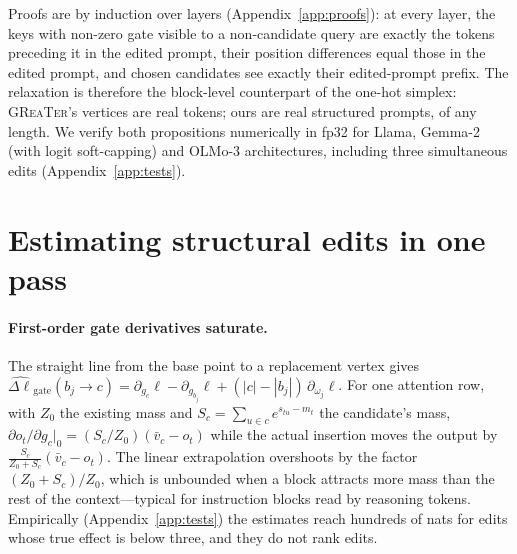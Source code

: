 \documentclass{article}
\newcommand{\greater}{\textsc{GReaTer}}
\begin{document}
Proofs are by induction over layers (Appendix~\ref{app:proofs}): at every layer,
the keys with non-zero gate visible to a non-candidate query are exactly the tokens
preceding it in the edited prompt, their position differences equal those in the
edited prompt, and chosen candidates see exactly their edited-prompt prefix. The
relaxation is therefore the block-level counterpart of the one-hot simplex:
\greater{}'s vertices are real tokens; ours are real structured prompts, of any
length. We verify both propositions numerically in fp32 for Llama, Gemma-2 (with
logit soft-capping) and OLMo-3 architectures, including three simultaneous edits
(Appendix~\ref{app:tests}).

\section{Estimating structural edits in one pass}
\label{sec:estimator}

\paragraph{First-order gate derivatives saturate.} The straight line from the base
point to a replacement vertex gives
$\widehat{\Delta\ell}_{\text{gate}}(b_j\!\to\!c)=\partial_{g_c}\ell-\partial_{g_{b_j}}\ell+(|c|-|b_j|)\,\partial_{\omega_j}\ell$.
For one attention row, with $Z_0$ the existing mass and $S_c=\sum_{u\in c}e^{s_{tu}-m_t}$
the candidate's mass, $\partial o_t/\partial g_c|_{0}=(S_c/Z_0)(\bar v_c-o_t)$ while the
actual insertion moves the output by $\frac{S_c}{Z_0+S_c}(\bar v_c-o_t)$. The linear
extrapolation overshoots by the factor $(Z_0+S_c)/Z_0$, which is unbounded when a
block attracts more mass than the rest of the context---typical for instruction
blocks read by reasoning tokens. Empirically (Appendix~\ref{app:tests}) the estimates
reach hundreds of nats for edits whose true effect is below three, and they do not
rank edits.
\end{document}
